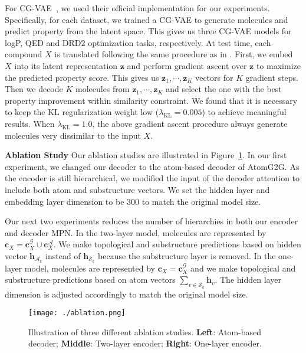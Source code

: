 \documentclass{article} \usepackage{iclr2020_conference,times}
\newcommand{\graph}{\mathcal{G}}
\def\vc{{\bm{c}}}
\def\vh{{\bm{h}}}
\def\vz{{\bm{z}}}
\def\gA{{\mathcal{A}}}
\def\gS{{\mathcal{S}}}
\begin{document}
For CG-VAE~\citep{liu2018constrained}, we used their official implementation for our experiments. Specifically, for each dataset, we trained a CG-VAE to generate molecules and predict property from the latent space. This gives us three CG-VAE models for logP, QED and DRD2 optimization tasks, respectively. 
At test time, each compound $X$ is translated following the same procedure as in \citet{jin2018junction}. First, we embed $X$ into its latent representation $\vz$ and perform gradient ascent over $\vz$ to maximize the predicted property score. This gives us $\vz_1,\cdots,\vz_K$ vectors for $K$ gradient steps. Then we decode $K$ molecules from $\vz_1,\cdots,\vz_K$ and select the one with the best property improvement within similarity constraint.
We found that it is necessary to keep the KL regularization weight low ($\lambda_{\mathrm{KL}}=0.005$) to achieve meaningful results. When $\lambda_{\mathrm{KL}}=1.0$, the above gradient ascent procedure always generate molecules very dissimilar to the input $X$.

\textbf{Ablation Study } Our ablation studies are illustrated in Figure~\ref{fig:ablation}. In our first experiment, we changed our decoder to the atom-based decoder of AtomG2G. As the encoder is still hierarchical, we modified the input of the decoder attention to include both atom and substructure vectors. We set the hidden layer and embedding layer dimension to be 300 to match the original model size. 

Our next two experiments reduces the number of hierarchies in both our encoder and decoder MPN. In the two-layer model, molecules are represented by $\vc_X = \vc_X^\graph \cup \vc_X^\gA$. We make topological and substructure predictions based on hidden vector $\vh_{\gA_k}$ instead of $\vh_{\gS_k}$ because the substructure layer is removed. 
In the one-layer model, molecules are represented by $\vc_X = \vc_X^\graph$ and we make topological and substructure predictions based on atom vectors $\sum_{v\in \gS_k} \vh_v$. The hidden layer dimension is adjusted accordingly to match the original model size.

\begin{figure}[t]
    \centering
    \texttt{[image: ./ablation.png]}
    \caption{Illustration of three different ablation studies. \textbf{Left}: Atom-based decoder; \textbf{Middle}: Two-layer encoder; \textbf{Right}: One-layer encoder. }
    \label{fig:ablation}
\end{figure} 
\end{document}
